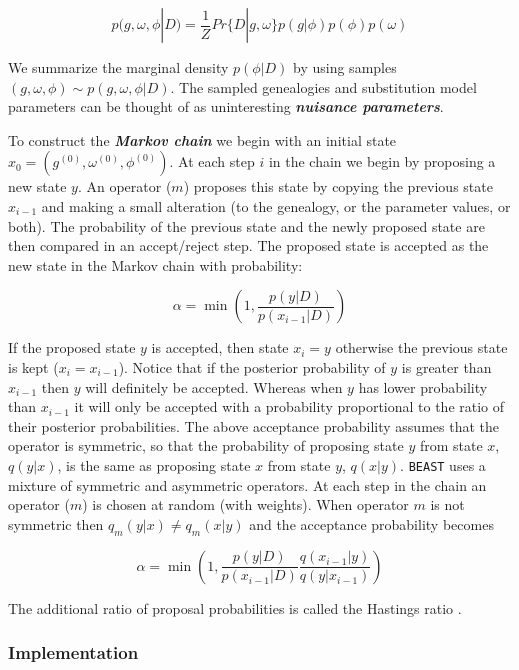 \documentclass[cup7b, english]{cupbook}
\begin{document}
\begin{equation}
p(g, \omega, \phi|D) = \frac{1}{Z} Pr\{D|g, \omega\}p(g|\phi)p(\phi)p(\omega)
\end{equation}

We summarize the marginal density $p(\phi|D)$ by using samples
$(g, \omega, \phi) \sim p(g, \omega, \phi|D)$. The sampled genealogies and
substitution model parameters can be thought of as uninteresting \textbf{\textit{nuisance
parameters}}.

To construct the \textbf{\textit{Markov chain}} we begin with an initial state
$x_0 = (g^{(0)}, \omega^{(0)}, \phi^{(0)})$. At each step $i$ in the chain we begin
by proposing a new state $y$. An operator ($m$) proposes this state by copying
the previous state $x_{i-1}$ and making a small alteration (to the genealogy, or the parameter values, or both).
The probability of the previous state and the newly proposed state are then compared in an accept/reject step.
The proposed state is accepted as the new state in the Markov chain with probability:

\begin{equation}
\alpha = \min \left(1,\frac{p(y|D)}{p(x_{i-1}|D)} \right)
\end{equation}

If the proposed state $y$ is accepted, then state $x_i = y$ otherwise the previous
state is kept ($x_i = x_{i-1}$). Notice that if the posterior probability of $y$ is greater than $x_{i-1}$
then $y$ will definitely be accepted. Whereas when $y$ has lower probability than $x_{i-1}$ it
will only be accepted with a probability proportional to the ratio of their posterior probabilities.
The above acceptance probability assumes that the operator is symmetric, so that
the probability of proposing state $y$ from state $x$, $q(y|x)$, is the same as proposing state $x$ from
state $y$, $q(x|y)$. \texttt{BEAST} uses a mixture of symmetric and asymmetric operators. At each step in the chain
an operator ($m$) is chosen at random (with weights). When operator $m$ is
not symmetric then $q_m(y|x) \neq q_m(x|y)$ and the acceptance probability becomes

\begin{equation}
\alpha = \min \left(1,\frac{p(y|D)}{p(x_{i-1}|D)}\frac{q(x_{i-1}|y)}{q(y|x_{i-1})}\right)
\end{equation}

The additional ratio of proposal probabilities is called the Hastings ratio \cite{Hastings1970}.

\subsubsection{Implementation}
\end{document}
